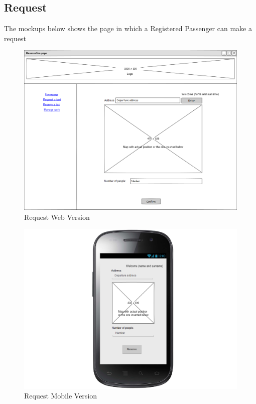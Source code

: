 \subsection{Request}
The mockups below shows the page in which a Registered Passenger can make a request
\begin{figure}[H]
\centering
\includegraphics[scale=0.35]{mockups/request_web.png}
\caption{Request Web Version}
\end{figure}
\begin{figure}[H]
\centering
\includegraphics[scale=0.35]{mockups/request_mobile.png}
\caption{Request Mobile Version}
\end{figure}
\break

